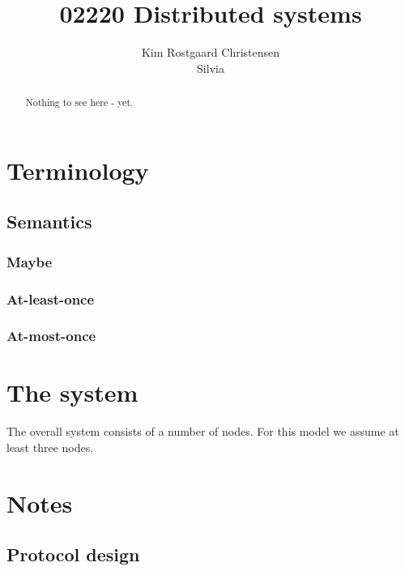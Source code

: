 \documentclass[10pt,a4paper]{article}
\begin{document}
\def\File#1{\textsf{#1}}
\def\Code#1{\texttt{#1}}
\def\Key#1{\textsf{#1}}

\title{02220 Distributed systems}
\author{Kim Rostgaard Christensen \\ Silvia}

\maketitle

\tableofcontents

\begin{abstract}
Nothing to see here - yet.
\end{abstract}

\section{Terminology}

\subsection{Semantics}

\subsubsection{Maybe}
\subsubsection{At-least-once}
\subsubsection{At-most-once}

\section{The system}

The overall system consists of a number of nodes. For this model we assume at least three nodes.

\section{Notes}
\subsection{Protocol design}
\end{document}
